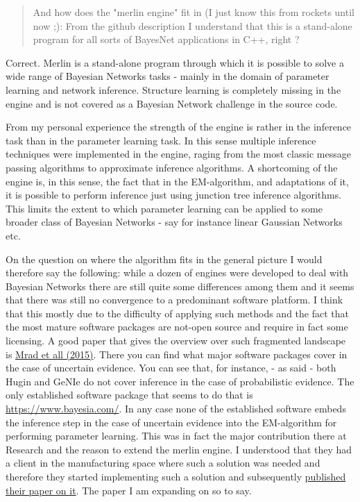 \documentclass[a4paper]{article}
\begin{document}
\begin{quote}
And how does the "merlin engine" fit in (I just know this from
rockets until now ;): From the github description I understand that
this is a stand-alone program for all sorts of BayesNet applications
in C++, right ?
\end{quote}

Correct. Merlin is a stand-alone program through which it is
possible to solve a wide range of Bayesian Networks tasks - mainly
in the domain of parameter learning and network inference. Structure
learning is completely missing in the engine and is not covered as a
Bayesian Network challenge in the source code.

From my personal experience the strength of the engine is rather in
the inference task than in the parameter learning task. In this
sense multiple inference techniques were implemented in the engine,
raging from the most classic message passing algorithms to
approximate inference algorithms. A shortcoming of the engine is, in
this sense, the fact that in the EM-algorithm, and adaptations of
it, it is possible to perform inference just using junction tree
inference algorithms. This limits the extent to which parameter
learning can be applied to some broader class of Bayesian Networks -
say for instance linear Gaussian Networks etc.

On the question on where the algorithm fits in the general picture I
would therefore say the following: while a dozen of engines were
developed to deal with Bayesian Networks there are still quite some
differences among them and it seems that there was still no
convergence to a predominant software platform. I think that this
mostly due to the difficulty of applying such methods and the fact
that the most mature software packages are not-open source and
require in fact some licensing. A good paper that gives the overview
over such fragmented landscape is \href{https://link.springer.com/article/10.1007/s10489-015-0678-6}{Mrad et all (2015)}. There you can
find what major software packages cover in the case of uncertain
evidence. You can see that, for instance, - as said - both Hugin
and GeNIe do not cover inference in the case of probabilistic
evidence. The only established software package that seems to do
that is \url{https://www.bayesia.com/}. In any case none of the
established software embeds the inference step in the case of
uncertain evidence into the EM-algorithm for performing parameter
learning. This was in fact the major contribution there at Research
and the reason to extend the merlin engine. I understood that they
had a client in the manufacturing space where such a solution was
needed and therefore they started implementing such a solution and
subsequently \href{https://ojs.aaai.org/index.php/AAAI/article/view/17447}{published their paper on it}. The paper I am expanding
on so to say.
\end{document}
